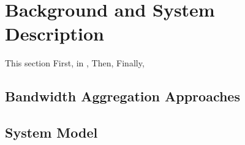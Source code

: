 \section{Background and System Description}\label{sec:network:background}
This section
First, in ,
Then,
Finally,

\subsection{Bandwidth Aggregation Approaches}

\subsection{System Model}
